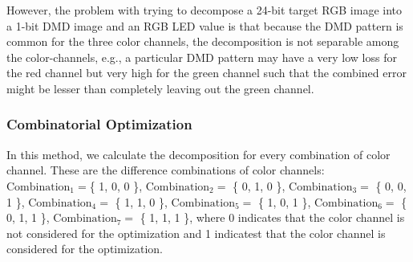 However, the problem with trying to decompose a 24-bit target RGB image into a 1-bit DMD image and an RGB LED value is that because the DMD pattern is common for the three color channels, the decomposition is not separable among the color-channels, e.g., a particular DMD pattern may have a very low loss for the red channel but very high for the green channel such that the combined error might be lesser than completely leaving out the green channel. 

\subsubsection{Combinatorial Optimization}
\label{sec:acd:combinatorial}
In this method, we calculate the decomposition for every combination of color channel. 
These are the difference combinations of color channels: $\text{Combination}_1 = $\{ 1, 0, 0 \}, $\text{Combination}_2 = $ \{ 0, 1, 0 \}, $\text{Combination}_3 = $ \{ 0, 0, 1 \}, $\text{Combination}_4 = $ \{ 1, 1, 0 \}, $\text{Combination}_5 = $ \{ 1, 0, 1 \}, $\text{Combination}_6 = $ \{ 0, 1, 1 \}, $\text{Combination}_7 = $ \{ 1, 1, 1 \}, where 0 indicates that the color channel is not considered for the optimization and 1 indicatest that the color channel is considered for the optimization. 

